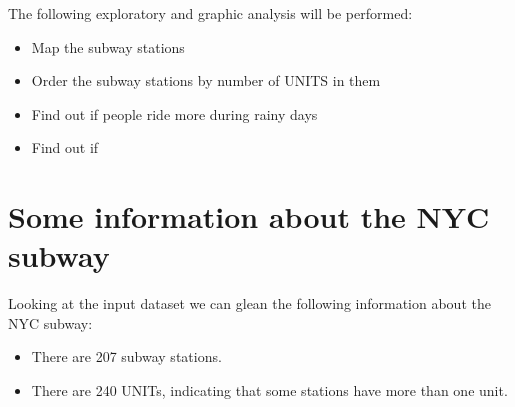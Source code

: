 \documentclass{article}
\begin{document}
The following exploratory and graphic analysis will be performed:
\begin{itemize}
\item{ Map the subway stations}
\item{ Order the subway stations by number of UNITS in them}
\item{ Find out if people ride more during rainy days}
\item Find out if

\end{itemize}

\section{Some information about the NYC subway}

Looking at the input dataset we can glean the following information about the NYC subway:
\begin{itemize}
\item There are 207 subway stations.
\item There are 240 UNITs, indicating that some stations have more than one unit.
\end{itemize}
\end{document}

